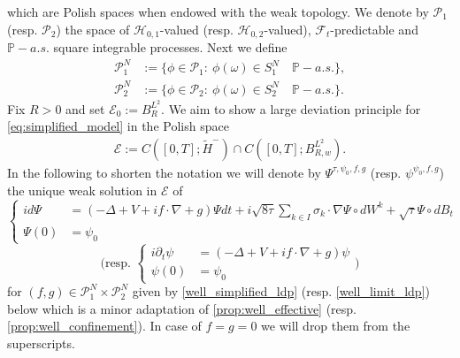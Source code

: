 \documentclass[a4paper,10pt]{amsart}
\theoremstyle{remark}
\numberwithin{equation}{section}
\begin{document}
which are Polish spaces when endowed with the weak topology. 
We denote by $\mathcal{P}_{1}$ (resp. $\mathcal{P}_{2}$) the space of $\mathcal{H}_{0,1}$-valued (resp. $\mathcal{H}_{0,2}$-valued), $\mathcal{F}_t$-predictable and $\mathbb{P}-a.s.$ square integrable processes. Next we define 
\begin{align*}
    \mathcal{P}_1^N
    &:=\{\phi\in \mathcal{P}_1:
    \ \phi(\omega)\in S_1^N\quad \mathbb{P}-a.s.\},\\
    \mathcal{P}_2^N
    &:=\{\phi\in \mathcal{P}_2:
    \ \phi(\omega)\in S_2^N\quad \mathbb{P}-a.s.\}.
\end{align*}
Fix $R>0$ and set $\mathcal{E}_0:=B^{L^2}_R$. We aim to show a large deviation principle for \eqref{eq:simplified_model} in the Polish space
\begin{align*}
    \mathcal{E}:=C([0,T];\tilde{H}^{-})\cap C([0,T];B^{L^2}_{R,w}).
\end{align*}
In the following to shorten the notation we will denote by $\Psi^{\tau,\psi_0,f,g}$ (resp. $\psi^{\psi_0,f,g}$) the unique weak solution in $\mathcal{E}$
of 
\begin{equation}\label{eq:simplified_model_ldp}
     \begin{cases}
         i d\Psi&=(-\Delta+V+if\cdot\nabla+g)\Psi dt+i\sqrt{8\tau}\sum_{k\in I}\sigma_k\cdot\nabla \Psi\circ dW^k  +\sqrt{\tau} \Psi\circ dB_t\\ \Psi(0)&=\psi_0
     \end{cases}
\end{equation}
\begin{equation}\label{eq:limit_model_ldp}\mbox{(resp. }
     \begin{cases}
         i \partial_t\psi&=(-\Delta+V+if\cdot\nabla+g)\psi \\ \psi(0)&=\psi_0
     \end{cases}\mbox{)}
\end{equation}
for $(f,g)\in \mathcal{P}_1^N\times \mathcal{P}_2^N$ given by \cref{well_simplified_ldp} (resp. \cref{well_limit_ldp}) below which is a minor adaptation of \cref{prop:well_effective} (resp. \cref{prop:well_confinement}). In case of $f=g=0$ we will drop them from the superscripts.
\end{document}
